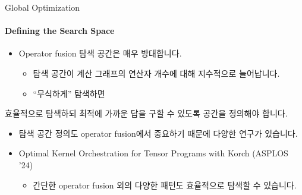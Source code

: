\begin{frame}{Global Optimization}
\framesubtitle{Defining the Search Space}

\begin{itemize}
  \item Operator fusion 탐색 공간은 매우 방대합니다.
  \begin{itemize}
    \item 탐색 공간이 계산 그래프의 연산자 개수에 대해 지수적으로 늘어납니다.
    \item ``무식하게'' 탐색하면 
  \end{itemize}
\end{itemize}

\pause
\begin{tcolorbox}[title={탐색 공간의 정의}]
  효율적으로 탐색하되 최적에 가까운 답을 구할 수 있도록 공간을 정의해야 합니다.
\end{tcolorbox}

\pause
\begin{itemize}
  \item 탐색 공간 정의도 operator fusion에서 중요하기 때문에 다양한 연구가 있습니다.
  \item Optimal Kernel Orchestration for Tensor Programs with Korch (ASPLOS '24)
  \begin{itemize}
    \item 간단한 operator fusion 외의 다양한 패턴도 효율적으로 탐색할 수 있습니다.
  \end{itemize}
\end{itemize}
\end{frame}

